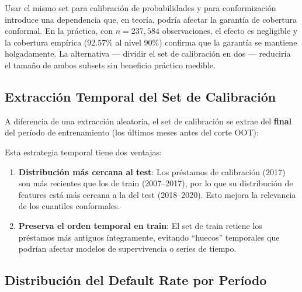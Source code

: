 \documentclass[
  spanish,
  11pt,
  letterpaper,
]{scrbook}
\providecommand{\tightlist}{%
  \setlength{\itemsep}{0pt}\setlength{\parskip}{0pt}}
\theoremstyle{plain}
\theoremstyle{remark}
\begin{document}
\begin{tcolorbox}[enhanced jigsaw, arc=.35mm, bottomrule=.15mm, bottomtitle=1mm, breakable, colback=white, colbacktitle=quarto-callout-note-color!10!white, colframe=quarto-callout-note-color-frame, coltitle=black, left=2mm, leftrule=.75mm, opacityback=0, opacitybacktitle=0.6, rightrule=.15mm, title=\textcolor{quarto-callout-note-color}{\faInfo}\hspace{0.5em}{¿Reutilizar el set de calibración para ambas funciones?}, titlerule=0mm, toprule=.15mm, toptitle=1mm]

Usar el mismo set para calibración de probabilidades y para
conformización introduce una dependencia que, en teoría, podría afectar
la garantía de cobertura conformal. En la práctica, con
\(n = 237{,}584\) observaciones, el efecto es negligible y la cobertura
empírica (92.57\% al nivel 90\%) confirma que la garantía se mantiene
holgadamente. La alternativa --- dividir el set de calibración en dos
--- reduciría el tamaño de ambos subsets sin beneficio práctico medible.

\end{tcolorbox}

\subsection{Extracción Temporal del Set de
Calibración}\label{extracciuxf3n-temporal-del-set-de-calibraciuxf3n}

A diferencia de una extracción aleatoria, el set de calibración se
extrae del \textbf{final} del período de entrenamiento (los últimos
meses antes del corte OOT):

Esta estrategia temporal tiene dos ventajas:

\begin{enumerate}
\def\labelenumi{\arabic{enumi}.}
\tightlist
\item
  \textbf{Distribución más cercana al test}: Los préstamos de
  calibración (2017) son más recientes que los de train (2007--2017),
  por lo que su distribución de features está más cercana a la del test
  (2018--2020). Esto mejora la relevancia de los cuantiles conformales.
\item
  \textbf{Preserva el orden temporal en train}: El set de train retiene
  los préstamos más antiguos íntegramente, evitando ``huecos''
  temporales que podrían afectar modelos de supervivencia o series de
  tiempo.
\end{enumerate}

\subsection{Distribución del Default Rate por
Período}\label{distribuciuxf3n-del-default-rate-por-peruxedodo}
\end{document}

